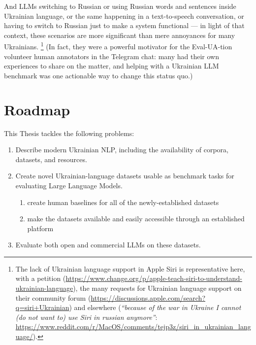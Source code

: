 And LLMs switching to Russian or using Russian words and sentences inside Ukrainian language, or the same happening in a text-to-speech conversation, or having to switch to Russian just to make a system functional --- in light of that context, 
these scenarios are more significant than mere annoyances for many Ukrainians.%
\footnote{The lack of Ukrainian language support in Apple Siri is representative here, with a petition (\href{https://www.change.org/p/apple-teach-siri-to-understand-ukrainian-language}{https://www.change.org/p/apple-teach-siri-to-understand-ukrainian-language}), the many requests for Ukrainian language support on their community forum (\href{https://discussions.apple.com/search?q=siri+Ukrainian}{https://discussions.apple.com/search?q=siri+Ukrainian}) and elsewhere 
(\textit{\enquote{because of the war in Ukraine I cannot (do not want to) use Siri in russian anymore}}: \href{https://www.reddit.com/r/MacOS/comments/tejp3z/siri_in_ukrainian_language/}{https://www.reddit.com/r/MacOS/comments/tejp3z/siri\_in\_ukrainian\_language/}).
} 
(In fact, they were a powerful motivator for the Eval-UA-tion volunteer human annotators in the Telegram chat: many had their own experiences to share on the matter, and helping with a Ukrainian LLM benchmark was one actionable way to change this status quo.)

\section{Roadmap}\label{roadmap}

This Thesis tackles the following problems:

\begin{enumerate}
\tightlist
    \item Describe modern Ukrainian NLP, including the availability of corpora, datasets, and resources.
    \item Create novel Ukrainian-language datasets usable as benchmark tasks for evaluating Large Language Models.
    \begin{enumerate}
        \item create human baselines for all of the newly-established datasets
        \item make the datasets available and easily accessible through an established platform
    \end{enumerate}
    \item Evaluate both open and commercial LLMs on these datasets.
\end{enumerate}



